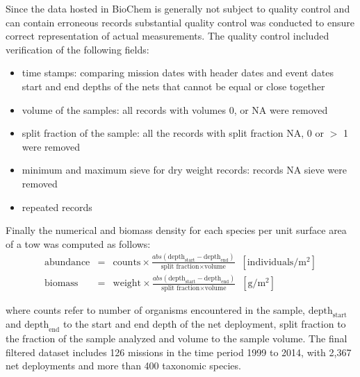 \documentclass[letterpaper,portrait,11pt]{scrartcl}
\numberwithin{equation}{section}		%
\numberwithin{figure}{section}		%
\numberwithin{table}{section}				%
\begin{document}
\begin{appendices}
Since the data hosted in BioChem is generally not subject to quality control and can contain erroneous records substantial quality control was conducted to ensure correct representation of actual measurements. The quality control included verification of the following fields: 

\begin{itemize}
  \item time stamps: comparing mission dates with header dates and event dates 
  start and end depths of the nets that cannot be equal or close together
  \item volume of the samples: all records with volumes 0, or NA were removed
  \item split fraction of the sample: all the records with split fraction NA, 0 or $>$ 1 were removed 
  \item minimum and maximum sieve for dry weight records: records NA sieve were removed
  \item repeated records 
\end{itemize}


Finally the numerical and biomass density for each species per unit surface area of a tow was computed as follows: 
\begin{eqnarray*}
\text{abundance} &=& \text{counts} \times \frac{  abs( \text{depth}_{\text{start}} - \text{depth}_{\text{end}} ) } { \text{split fraction} \times \text{volume} } \; \; [\text{individuals}/ \text{m}^{2} ]  \\
\text{biomass} &=& \text{weight} \times \frac{ abs( \text{depth}_{\text{start}} - \text{depth}_{\text{end}} )} { \text{split fraction} \times \text{volume}} \; \; [\text{g}/\text{m}^2]
\end{eqnarray*}

where counts refer to number of organisms encountered in the sample, $\text{depth}_{\text{start}}$ and $\text{depth}_{\text{end}}$ to the start and end depth of the net deployment, split fraction to the fraction of the sample analyzed and volume to the sample volume. The final filtered dataset includes 126 missions in the time period 1999 to 2014, with 2,367 net deployments and more than 400 taxonomic species. 

\end{appendices}
\end{document}

